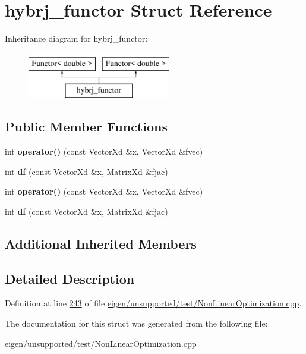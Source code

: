 \hypertarget{structhybrj__functor}{}\section{hybrj\+\_\+functor Struct Reference}
\label{structhybrj__functor}
Inheritance diagram for hybrj\+\_\+functor\+:\begin{figure}[H]
\begin{center}
\leavevmode
\includegraphics[height=2.000000cm]{structhybrj__functor}
\end{center}
\end{figure}
\subsection*{Public Member Functions}
\begin{DoxyCompactItemize}
\item 
\mbox{\label{structhybrj__functor_af59bdbf4822728cf643f6a839a37851b}} 
int {\bfseries operator()} (const Vector\+Xd \&x, Vector\+Xd \&fvec)
\item 
\mbox{\label{structhybrj__functor_a08650092115b6b5f35f4eb810bf2d725}} 
int {\bfseries df} (const Vector\+Xd \&x, Matrix\+Xd \&fjac)
\item 
\mbox{\label{structhybrj__functor_af59bdbf4822728cf643f6a839a37851b}} 
int {\bfseries operator()} (const Vector\+Xd \&x, Vector\+Xd \&fvec)
\item 
\mbox{\label{structhybrj__functor_a08650092115b6b5f35f4eb810bf2d725}} 
int {\bfseries df} (const Vector\+Xd \&x, Matrix\+Xd \&fjac)
\end{DoxyCompactItemize}
\subsection*{Additional Inherited Members}


\subsection{Detailed Description}


Definition at line \hyperlink{eigen_2unsupported_2test_2_non_linear_optimization_8cpp_source_l00243}{243} of file \hyperlink{eigen_2unsupported_2test_2_non_linear_optimization_8cpp_source}{eigen/unsupported/test/\+Non\+Linear\+Optimization.\+cpp}.



The documentation for this struct was generated from the following file\+:\begin{DoxyCompactItemize}
\item 
eigen/unsupported/test/\+Non\+Linear\+Optimization.\+cpp\end{DoxyCompactItemize}
